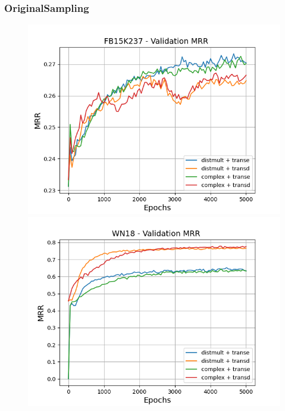 \subsubsection{OriginalSampling}

\begin{figure}
    \centering
    \begin{minipage}{.3\textwidth}
      \centering
      \includegraphics[width=\linewidth]{figures/results/gan_train/pretrained/random/fb15k237/gan_train_random_fb15k237_mrrs.png}
    \end{minipage}%
    \begin{minipage}{.3\textwidth}
      \centering
      \includegraphics[width=\linewidth]{figures/results/gan_train/pretrained/random/wn18/gan_train_random_wn18_mrrs.png}

\end{minipage}
\end{figure}
